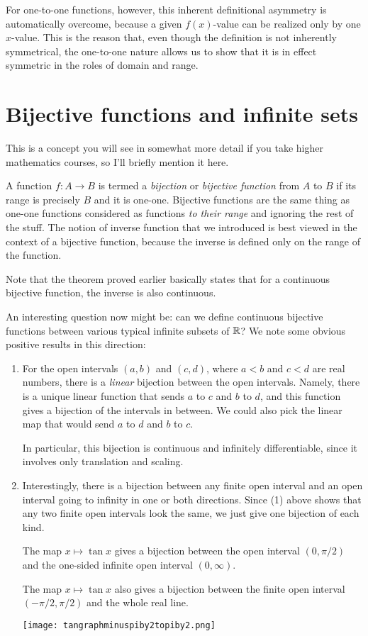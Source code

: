 \documentclass[10pt]{amsart}
\begin{document}
For one-to-one functions, however, this inherent definitional
asymmetry is automatically overcome, because a given $f(x)$-value can
be realized only by one $x$-value. This is the reason that, even
though the definition is not inherently symmetrical, the one-to-one
nature allows us to show that it is in effect symmetric in the roles
of domain and range.

\section{Bijective functions and infinite sets}

This is a concept you will see in somewhat more detail if you take
higher mathematics courses, so I'll briefly mention it here.

A function $f:A \to B$ is termed a {\em bijection} or {\em bijective
function} from $A$ to $B$ if its range is precisely $B$ and it is
one-one. Bijective functions are the same thing as one-one functions
considered as functions {\em to their range} and ignoring the rest of
the stuff. The notion of inverse function that we introduced is best
viewed in the context of a bijective function, because the inverse is
defined only on the range of the function.

Note that the theorem proved earlier basically states that for a
continuous bijective function, the inverse is also continuous.

An interesting question now might be: can we define continuous
bijective functions between various typical infinite subsets of $\mathbb{R}$?
We note some obvious positive results in this direction:

\begin{enumerate}
\item For the open intervals $(a,b)$ and $(c,d)$, where $a < b$ and $c
  < d$ are real numbers, there is a {\em linear} bijection between the
  open intervals. Namely, there is a unique linear function that sends
  $a$ to $c$ and $b$ to $d$, and this function gives a bijection of
  the intervals in between. We could also pick the linear map that
  would send $a$ to $d$ and $b$ to $c$.


  In particular, this bijection is continuous and infinitely
  differentiable, since it involves only translation and scaling.

\item Interestingly, there is a bijection between any finite open
  interval and an open interval going to infinity in one or both
  directions. Since (1) above shows that any two finite open intervals
  look the same, we just give one bijection of each kind.

  The map $x \mapsto \tan x$ gives a bijection between the open
  interval $(0,\pi/2)$ and the one-sided infinite open interval
  $(0,\infty)$.

  The map $x \mapsto \tan x$ also gives a bijection between the finite
  open interval $(-\pi/2,\pi/2)$ and the whole real line.

  \texttt{[image: tangraphminuspiby2topiby2.png]}

\end{enumerate}
\end{document}
